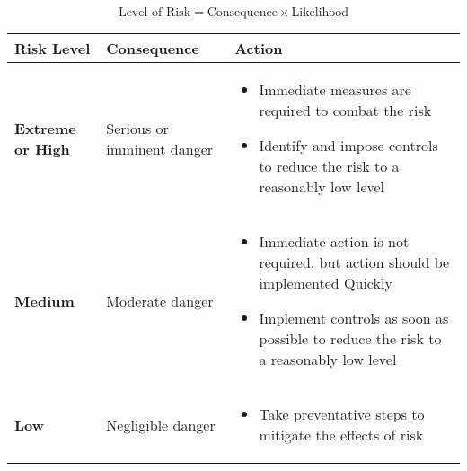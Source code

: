 \begin{equation*}
    \text{Level of Risk} = \text{Consequence} \times \text{Likelihood}
\end{equation*}
\begin{table*}
    \begin{tabular}{|l|l|l|}
        \hline
        \textbf{Risk Level} & \textbf{Consequence} & \textbf{Action}\\
        \hline
        \textbf{Extreme or High} & Serious or imminent danger & \begin{minipage}[t]{0.4\textwidth}
            \begin{itemize}
                \item Immediate measures are required to combat the risk
                \item Identify and impose controls to reduce the risk to a reasonably low level
            \end{itemize}
        \end{minipage} \\
        \hline
        \textbf{Medium} & Moderate danger & \begin{minipage}[t]{0.4\textwidth}
            \begin{itemize}
                \item Immediate action is not required, but action should be implemented Quickly
                \item Implement controls as soon as possible to reduce the risk to a reasonably low level  
            \end{itemize}
        \end{minipage}\\
        \hline
        \textbf{Low} & Negligible danger & \begin{minipage}[t]{0.4\textwidth}
            \begin{itemize}
                \item Take preventative steps to mitigate the effects of risk
            \end{itemize}
        \end{minipage}\\
        \hline
    \end{tabular}
\end{table*}
